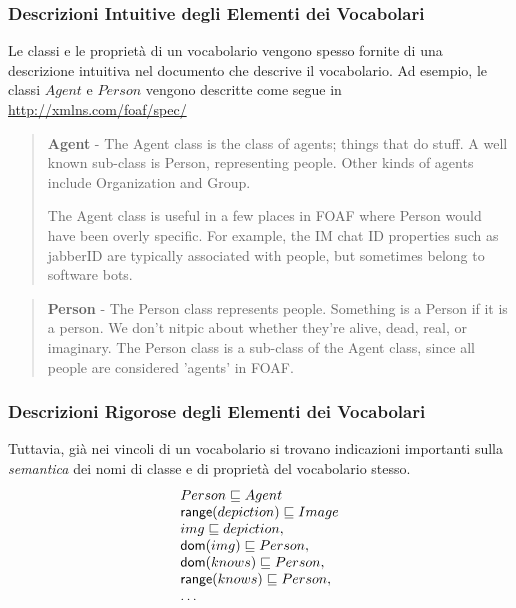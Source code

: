 \documentclass[8pt]{beamer}
\begin{document}
\begin{frame}
\frametitle{Descrizioni Intuitive degli Elementi dei Vocabolari}
	Le classi e le propriet\`a di un vocabolario vengono spesso fornite
	di una descrizione intuitiva nel documento che descrive il vocabolario.
	Ad esempio, le classi $Agent$ e $Person$ vengono descritte come segue
	in \url{http://xmlns.com/foaf/spec/}
	\begin{quote}
		\textbf{Agent} - The Agent class is the class of agents; things that do stuff. A well known
		sub-class is Person, representing people. Other kinds of agents include
		Organization and Group.
		
		The Agent class is useful in a few places in FOAF where Person would have
		been overly specific. For example, the IM chat ID properties such as
		jabberID are typically associated with people, but sometimes belong to
		software bots.
	\end{quote}

	\begin{quote}
		\textbf{Person} - The Person class represents people. Something is a Person if it is a person.
		We don't nitpic about whether they're alive, dead, real, or imaginary.
		The Person class is a sub-class of the Agent class, since all people are
		considered 'agents' in FOAF.
	\end{quote}
\end{frame}

\begin{frame}
\frametitle{Descrizioni Rigorose degli Elementi dei Vocabolari}
	Tuttavia, gi\`a nei vincoli di un vocabolario si trovano indicazioni importanti
	sulla \emph{semantica} dei nomi di classe e di propriet\`a del vocabolario stesso.
	\[
	\begin{array}{l}
	Person \sqsubseteq Agent\\
	\mathsf{range}(depiction) \sqsubseteq Image\\
	img \sqsubseteq depiction, \\
	\mathsf{dom}(img) \sqsubseteq Person,\\
	\mathsf{dom}(knows) \sqsubseteq Person,\\
	\mathsf{range}(knows) \sqsubseteq Person,\\
	\ldots
	\end{array}
	\]
\end{frame}
\end{document}
